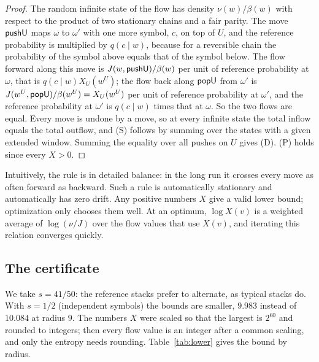 \begin{proof}
The random infinite state of the flow has density $\nu(w)/\beta(w)$ with respect to the product of two stationary
chains and a fair parity. The move $\mathsf{pushU}$ maps $\omega$ to $\omega'$ with one more symbol, $c$, on top of $U$, and the
reference probability is multiplied by $q(c\mid w)$, because for a reversible chain the probability of the symbol
above equals that of the symbol below. The flow forward along this move is $J(w,\mathsf{pushU})/\beta(w)$ per unit of reference
probability at $\omega$, that is $q(c\mid w)X_U(w^U)$; the flow back along $\mathsf{popU}$ from $\omega'$ is
$J(w^U,\mathsf{popU})/\beta(w^U)=X_U(w^U)$ per unit of reference probability at $\omega'$, and the reference probability at
$\omega'$ is $q(c\mid w)$ times that at $\omega$. So the two flows are equal. Every move is undone by a move, so at every infinite state the total inflow equals
the total outflow, and (S) follows by summing over the states with a given extended window. Summing the equality over
all pushes on $U$ gives (D). (P) holds since every $X>0$.
\end{proof}

Intuitively, the rule is in detailed balance: in the long run it crosses every move as often forward as backward.
Such a rule is automatically stationary and automatically has zero drift. Any positive numbers $X$ give a valid lower
bound; optimization only chooses them well. At an optimum, $\log X(v)$ is a weighted average of $\log(\nu/J)$ over
the flow values that use $X(v)$, and iterating this relation converges quickly.

\subsection{The certificate}

We take $s=41/50$: the reference stacks prefer to alternate, as typical stacks do. With $s=1/2$ (independent
symbols) the bounds are smaller, $9.983$ instead of $10.084$ at radius $9$. The numbers $X$ were scaled so that the
largest is $2^{60}$ and rounded to integers; then every flow value is an integer after a common scaling, and only the
entropy needs rounding. Table~\ref{tab:lower} gives the bound by radius.

